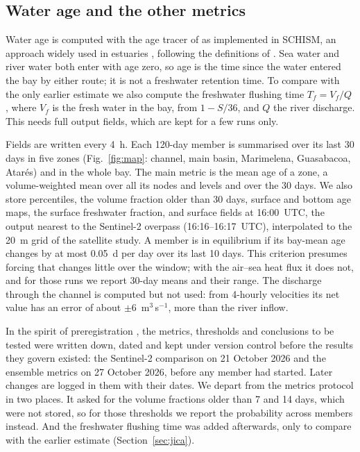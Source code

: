 \documentclass[a4paper,fleqn]{ems-dc}
\begin{document}
\subsection{Water age and the other metrics}\label{sec:metrics}
Water age is computed with the age tracer of \citet{Deleersnijder2001} \citep[see
also][]{Delhez1999} as implemented in SCHISM, an approach widely used in estuaries
\citep{Shen2004}, following the definitions of \citet{Monsen2002}. Sea water and river
water both enter with age zero, so age is the time since the water entered the bay by
either route; it is not a freshwater retention time. To compare with the only earlier
estimate we also compute the freshwater flushing time $T_f = V_f/Q$
\citep{Alber1999,Sheldon2002}, where $V_f$ is the fresh water in the bay, from $1 - S/36$,
and $Q$ the river discharge. This needs full output fields, which are kept for a few runs
only.

Fields are written every 4~h. Each 120-day member is summarised over its last 30 days in
five zones (Fig.~\ref{fig:map}: channel, main basin, Marimelena, Guasabacoa, Atar\'es) and
in the whole bay. The main metric is the mean age of a zone, a volume-weighted mean over all
its nodes and levels and over the 30 days. We also store percentiles, the volume fraction
older than 30 days, surface and bottom age maps, the surface freshwater fraction, and
surface fields at 16:00~UTC, the output nearest to the Sentinel-2 overpass
(16:16--16:17~UTC), interpolated to the 20~m grid of the satellite study. A member is in
equilibrium if its bay-mean age changes by at most 0.05~d per day over its last 10 days.
This criterion presumes forcing that changes little over the window; with the air--sea heat
flux it does not, and for those runs we report 30-day means and their range. The discharge
through the channel is computed but not used: from 4-hourly velocities its net value has an
error of about $\pm 6$~m$^3$\,s$^{-1}$, more than the river inflow.

In the spirit of preregistration \citep{Nosek2018}, the metrics, thresholds and conclusions
to be tested were written down, dated and kept under version control before the results
they govern existed: the Sentinel-2 comparison on 21 October 2026 and the ensemble metrics
on 27 October 2026, before any member had started. Later changes are logged in them with
their dates. We depart from the metrics protocol in two places. It asked for the volume
fractions older than 7 and 14 days, which were not stored, so for those thresholds we report
the probability across members instead. And the freshwater flushing time was added
afterwards, only to compare with the earlier estimate (Section~\ref{sec:jica}).
\end{document}
